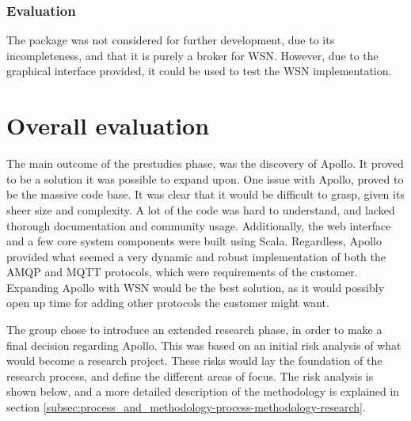 \subsubsection{Evaluation}
\label{subsec:prestudies-existing_solutions-micro_wsn_and_nffiplayer-evaluation}

The package was not considered for further development, due to its incompleteness, and that it is purely a broker for WSN. However, due to the graphical interface provided, it could be used to test the WSN implementation.

\section{Overall evaluation}
\label{sec:prestudies-overall_evaluation}

The main outcome of the prestudies phase, was the discovery of Apollo. It proved to be a solution it was possible to expand upon. One issue with Apollo, proved to be the massive code base. It was clear that it would be difficult to grasp, given its sheer size and complexity. A lot of the code was hard to understand, and lacked thorough documentation and community usage. Additionally, the web interface and a few core system components were built using Scala. Regardless, Apollo provided what seemed a very dynamic and robust implementation of both the AMQP and MQTT protocols, which were requirements of the customer. Expanding Apollo with WSN would be the best solution, as it would possibly open up time for adding other protocols the customer might want.

The group chose to introduce an extended research phase, in order to make a final decision regarding Apollo. This was based on an initial risk analysis of what would become a research project. These risks would lay the foundation of the research process, and define the different areas of focus. The risk analysis is shown below, and a more detailed description of the methodology is explained in section \ref{subsec:process_and_methodology-process-methodology-research}.

